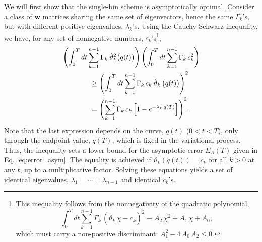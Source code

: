 \documentclass[reprint, superscriptaddress, floatfix]{revtex4-1}
\newcommand{\Err}{E}
\begin{document}
We will first show
that the single-bin scheme is asymptotically optimal.
%
Consider a class of $\mathbf w$ matrices
sharing the same set of eigenvectors,
hence the same $\Gamma_k$'s,
but with different positive eigenvalues,
$\lambda_k$'s.
%
Using the Cauchy-Schwarz inequality, we have,
for any set of nonnegative numbers, $c_k$'s\footnote{This
inequality follows from the nonnegativity of
the quadratic polynomial,
$$
\int_0^T
  dt \sum_{k = 1}^{n-1} \Gamma_k \,
    \left( {\dot \vartheta}_k \, \chi - c_k \right)^2
  \equiv
  A_2 \, \chi^2 + A_1 \, \chi + A_0
  ,
$$
which must carry a non-positive discriminant:
$A_1^2 - 4 \, A_0 \, A_2 \le 0$.},
%
%
\begin{align}
&
\left(
  \int_0^T dt
    \sum_{k = 1}^{n-1}
      \Gamma_k \, {\dot \vartheta}_k^2\bigl( q(t) \bigr)
\right)
%
\left(
  \int_0^T dt
    \sum_{k = 1}^{n-1}
      \Gamma_k \, c_k^2
\right)
%
\notag
\\
&
\qquad \qquad
\ge
\left(
  \int_0^T dt
    \sum_{k = 1}^{n-1}
      \Gamma_k \, c_k \, {\dot \vartheta}_k \, \bigl( q(t) \bigr)
\right)^2
\notag
\\
&
\qquad \qquad
=
\left(
  \sum_{k = 1}^{n-1} \Gamma_k \, c_k
    \left[
      1 - e^{ -\lambda_k \, q(T) }
    \right]
\right)^2.
\notag
\end{align}
%
Note that the last expression %
depends on the curve, $q(t)$ ($0 < t < T$),
only through the endpoint value, $q(T)$,
which is fixed in the variational process.
%
Thus, the inequality sets a lower bound
for the asymptotic error $\Err_A(T)$
given in Eq. \eqref{eq:error_asym}.
%
The equality is achieved
if $\dot \vartheta_k\left( q(t) \right) = c_k$
for all $k > 0$ at any $t$,
up to a multiplicative factor.
%
Solving these equations yields
a set of identical eigenvalues,
$\lambda_1 = \cdots = \lambda_{n-1}$
and identical $c_k$'s.
\end{document}
